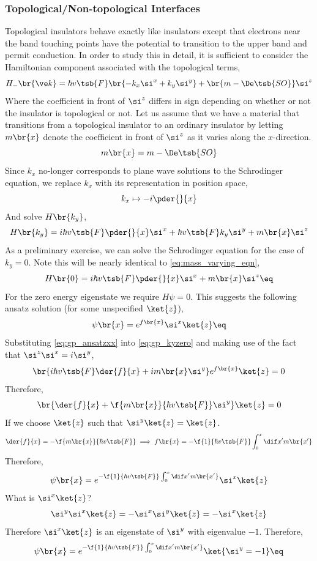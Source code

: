 \documentclass{article}
\begin{document}
\subsubsection{Topological/Non-topological Interfaces}

Topological insulators behave exactly like insulators except that electrons near the band touching points have the potential to transition to the upper band and permit conduction. In order to study this in detail, it is sufficient to consider the Hamiltonian component associated with the topological terms,
\[ H_{-}\br{\ve k} = \hbar v\tsb{F}\br{- k_x \si^{x} +k_y \si^{y}} + \br{m - \De\tsb{SO}} \si^{z} \]
Where the coefficient in front of $\si^{z}$ differs in sign depending on whether or not the insulator is topological or not. Let us assume that we have a material that transitions from a topological insulator to an ordinary insulator by letting $m\br{x}$ denote the coefficient in front of $\si^{z}$ as it varies along the $x$-direction.
\[ m\br{x} = m - \De\tsb{SO}\]
Since $k_x$ no-longer corresponds to plane wave solutions to the Schrodinger equation, we replace $k_x$ with its representation in position space,
\[ k_x \mapsto - i\pder{}{x} \]
And solve $H\br{k_y}$,
\[ H\br{k_y} = i \hbar v\tsb{F} \pder{}{x} \si^{x} + \hbar v\tsb{F} k_y \si^{y} + m\br{x} \si^{z} \]
As a preliminary exercise, we can solve the Schrodinger equation for the case of $k_y = 0$. Note this will be nearly identical to \cref{eq:mass_varying_eqn},
\[ H\br{0} = i \hbar v\tsb{F} \pder{}{x} \si^{x} + m\br{x} \si^{z} \eq \label{eq:gp_kyzero} \]
For the zero energy eigenstate we require $H\psi = 0$. This suggests the following ansatz solution (for some unspecified $\ket{z}$),
\[ \psi\br{x} = e^{f\br{x}} \si^{x} \ket{z} \eq \label{eq:gp_ansatzxx}\]
Substituting \cref{eq:gp_ansatzxx} into \cref{eq:gp_kyzero} and making use of the fact that $\si^{z} \si^{x} = i\si^{y}$,
\[ \br{i \hbar v\tsb{F} \der{f}{x} + i m\br{x} \si^{y}} e^{f\br{x}} \ket{z} = 0 \]
Therefore,
\[ \br{\der{f}{x} + \f{m\br{x}}{\hbar v\tsb{F}} \si^{y}} \ket{z} = 0 \]
If we choose $\ket{z}$ such that $\si^{y}\ket{z} = \ket{z}$.
\[ \der{f}{x} = - \f{m\br{x}}{\hbar v\tsb{F}} \implies f\br{x} = - \f{1}{\hbar v\tsb{F}} \int_{0}^{x} \dif x' m\br{x'} \]
Therefore,
\[ \psi\br{x} = e^{- \f{1}{\hbar v\tsb{F}} \int_{0}^{x} \dif x' m\br{x'}} \si^{x} \ket{z} \]
What is $\si^{x} \ket{z}$?
\[ \si^{y}\si^{x} \ket{z} = -\si^{x}\si^{y} \ket{z} = - \si^{x}\ket{z} \]
Therefore $\si^{x}\ket{z}$ is an eigenstate of $\si^{y}$ with eigenvalue $-1$. Therefore,
\[ \psi\br{x} = e^{- \f{1}{\hbar v\tsb{F}} \int_{0}^{x} \dif x' m\br{x'}}\ket{\si^{y} = -1} \eq \label{eq:jackiv_relli}\]
\end{document}
